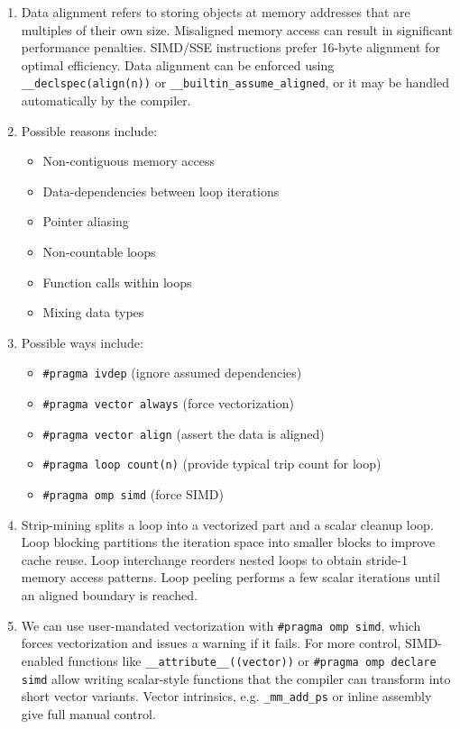 \documentclass[unicode,10pt,a4paper,oneside,numbers=endperiod,openany]{scrartcl}
\begin{document}
\begin{enumerate}
\item Data alignment refers to storing objects at memory addresses that are multiples of their own size. Misaligned memory access can result in significant performance penalties. SIMD/SSE instructions prefer 16-byte alignment for optimal efficiency. Data alignment can be enforced using \texttt{\_\_declspec(align(n))} or \texttt{\_\_builtin\_assume\_aligned}, or it may be handled automatically by the compiler.


\item Possible reasons include: \begin{itemize}
\item Non-contiguous memory access


\item Data-dependencies between loop iterations


\item Pointer aliasing


\item Non-countable loops


\item Function calls within loops


\item Mixing data types
\end{itemize}


\item Possible ways include: \begin{itemize}
\item \texttt{\#pragma ivdep} (ignore assumed dependencies)


\item \texttt{\#pragma vector always} (force vectorization)


\item \texttt{\#pragma vector align} (assert the data is aligned)


\item \texttt{\#pragma loop count(n)} (provide typical trip count for loop)


\item \texttt{\#pragma omp simd} (force SIMD)
\end{itemize}


\item Strip-mining splits a loop into a vectorized part and a scalar cleanup loop. Loop blocking partitions the iteration space into smaller blocks to improve cache reuse. Loop interchange reorders nested loops to obtain stride-1 memory access patterns. Loop peeling performs a few scalar iterations until an aligned boundary is reached.


\item We can use user-mandated vectorization with \texttt{\#pragma omp simd}, which forces vectorization and issues a warning if it fails. For more control, SIMD-enabled functions like \texttt{\_\_attribute\_\_((vector))} or \texttt{\#pragma omp declare simd} allow writing scalar-style functions that the compiler can transform into short vector variants. Vector intrinsics, e.g. \texttt{\_mm\_add\_ps} or inline assembly give full manual control.
\end{enumerate}
\end{document}
